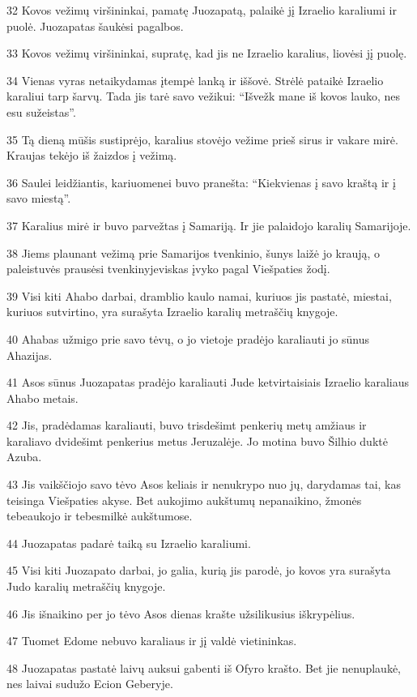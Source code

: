 \par 32 Kovos vežimų viršininkai, pamatę Juozapatą, palaikė jį Izraelio karaliumi ir puolė. Juozapatas šaukėsi pagalbos. 
\par 33 Kovos vežimų viršininkai, supratę, kad jis ne Izraelio karalius, liovėsi jį puolę. 
\par 34 Vienas vyras netaikydamas įtempė lanką ir iššovė. Strėlė pataikė Izraelio karaliui tarp šarvų. Tada jis tarė savo vežikui: “Išvežk mane iš kovos lauko, nes esu sužeistas”. 
\par 35 Tą dieną mūšis sustiprėjo, karalius stovėjo vežime prieš sirus ir vakare mirė. Kraujas tekėjo iš žaizdos į vežimą. 
\par 36 Saulei leidžiantis, kariuomenei buvo pranešta: “Kiekvienas į savo kraštą ir į savo miestą”. 
\par 37 Karalius mirė ir buvo parvežtas į Samariją. Ir jie palaidojo karalių Samarijoje. 
\par 38 Jiems plaunant vežimą prie Samarijos tvenkinio, šunys laižė jo kraują, o paleistuvės prausėsi tvenkinyje­viskas įvyko pagal Viešpaties žodį. 
\par 39 Visi kiti Ahabo darbai, dramblio kaulo namai, kuriuos jis pastatė, miestai, kuriuos sutvirtino, yra surašyta Izraelio karalių metraščių knygoje. 
\par 40 Ahabas užmigo prie savo tėvų, o jo vietoje pradėjo karaliauti jo sūnus Ahazijas. 
\par 41 Asos sūnus Juozapatas pradėjo karaliauti Jude ketvirtaisiais Izraelio karaliaus Ahabo metais. 
\par 42 Jis, pradėdamas karaliauti, buvo trisdešimt penkerių metų amžiaus ir karaliavo dvidešimt penkerius metus Jeruzalėje. Jo motina buvo Šilhio duktė Azuba. 
\par 43 Jis vaikščiojo savo tėvo Asos keliais ir nenukrypo nuo jų, darydamas tai, kas teisinga Viešpaties akyse. Bet aukojimo aukštumų nepanaikino, žmonės tebeaukojo ir tebesmilkė aukštumose. 
\par 44 Juozapatas padarė taiką su Izraelio karaliumi. 
\par 45 Visi kiti Juozapato darbai, jo galia, kurią jis parodė, jo kovos yra surašyta Judo karalių metraščių knygoje. 
\par 46 Jis išnaikino per jo tėvo Asos dienas krašte užsilikusius iškrypėlius. 
\par 47 Tuomet Edome nebuvo karaliaus ir jį valdė vietininkas. 
\par 48 Juozapatas pastatė laivų auksui gabenti iš Ofyro krašto. Bet jie nenuplaukė, nes laivai sudužo Ecion Geberyje. 
